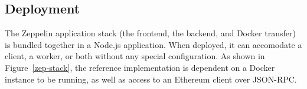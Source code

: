 
\subsection{Deployment}
The Zeppelin application stack (the frontend, the backend, and Docker transfer) is bundled together in a Node.js application. When deployed, it can accomodate a client, a worker, or both without any special configuration. As shown in Figure~\ref{zep-stack}, the reference implementation is dependent on a Docker instance to be running, as well as access to an Ethereum client over JSON-RPC.
